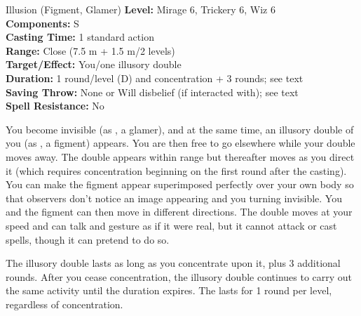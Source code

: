 {Illusion (Figment, Glamer)}
{
	\textbf{Level:}
	Mirage 6, Trickery 6, Wiz 6\\
	\textbf{Components:}
	S\\
	\textbf{Casting Time:}
	1 standard action\\
	\textbf{Range:}
	Close (7.5 m + 1.5 m/2 levels)\\
	\textbf{Target/Effect:}
	You/one illusory double\\
	\textbf{Duration:}
	1 round/level (D) and concentration + 3 rounds; see text\\
	\textbf{Saving Throw:}
	None or Will disbelief (if interacted with); see text\\
	\textbf{Spell Resistance:}
	No\\
}
{
	You become invisible (as , a glamer), and at the same time, an illusory double of you (as , a figment) appears. You are then free to go elsewhere while your double moves away. The double appears within range but thereafter moves as you direct it (which requires concentration beginning on the first round after the casting). You can make the figment appear superimposed perfectly over your own body so that observers don't notice an image appearing and you turning invisible. You and the figment can then move in different directions. The double moves at your speed and can talk and gesture as if it were real, but it cannot attack or cast spells, though it can pretend to do so.

	The illusory double lasts as long as you concentrate upon it, plus 3 additional rounds. After you cease concentration, the illusory double continues to carry out the same activity until the duration expires. The  lasts for 1 round per level, regardless of concentration.

}
